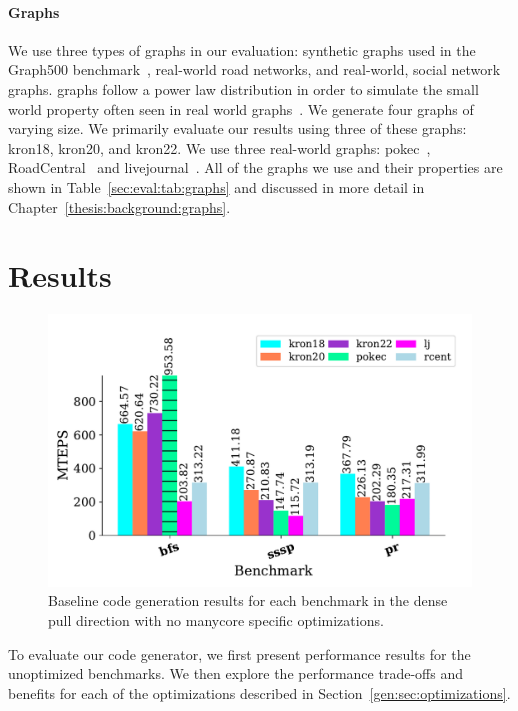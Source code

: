 \paragraph{Graphs} We use three types of graphs in our evaluation: synthetic \kron graphs used in the Graph500 benchmark~\cite{murphy2010graph500}, real-world road networks, and real-world, social network graphs.
\kron graphs follow a power law distribution in order to simulate the small world property often seen in real world graphs~\cite{leskovec2010kronecker}.
We generate four \kron graphs of varying size. 
We primarily evaluate our results using three of these graphs: kron18, kron20, and kron22.
We use three real-world graphs: pokec~\cite{pokec}, RoadCentral~\cite{davis2011university} and livejournal~\cite{lj}.
All of the graphs we use and their properties are shown in Table~\ref{sec:eval:tab:graphs} and discussed in more detail in Chapter~\ref{thesis:background:graphs}.


\section{Results}
\begin{figure}[h!]
    \centering
    \includegraphics[scale = 0.6]{graphit-figures/baseline.pdf}
    \caption{Baseline code generation results for each benchmark in the dense pull direction with no manycore specific optimizations.}
    \label{pap:generals:sec:eval:fig:baseline}
\end{figure}

To evaluate our code generator, we first present performance results for the unoptimized benchmarks. 
We then explore the performance trade-offs and benefits for each of the optimizations described in Section~\ref{gen:sec:optimizations}.

